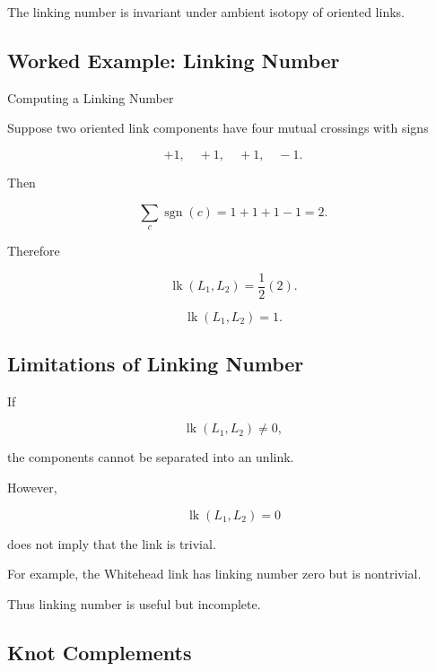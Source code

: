The linking number is invariant under ambient isotopy of oriented links.

\subsection{Worked Example: Linking Number}
\label{subsec:worked-linking-number}

\begin{workedexamplebox}{Computing a Linking Number}

Suppose two oriented link components have four mutual crossings with signs

\[
+1,\quad+1,\quad+1,\quad-1.
\]

Then

\[
\sum_c\operatorname{sgn}(c)
=
1+1+1-1
=
2.
\]

Therefore

\[
\operatorname{lk}(L_1,L_2)
=
\frac12(2).
\]

\begin{answerbox}
\[
\boxed{
\operatorname{lk}(L_1,L_2)=1.
}
\]
\end{answerbox}
\end{workedexamplebox}

\subsection{Limitations of Linking Number}
\label{subsec:limitations-linking-number}

If

\[
\operatorname{lk}(L_1,L_2)\neq0,
\]

the components cannot be separated into an unlink.

However,

\[
\boxed{
\operatorname{lk}(L_1,L_2)=0
}
\]

does not imply that the link is trivial.

For example, the Whitehead link has linking number zero but is nontrivial.

Thus linking number is useful but incomplete.

\subsection{Knot Complements}
\label{subsec:knot-complements}

